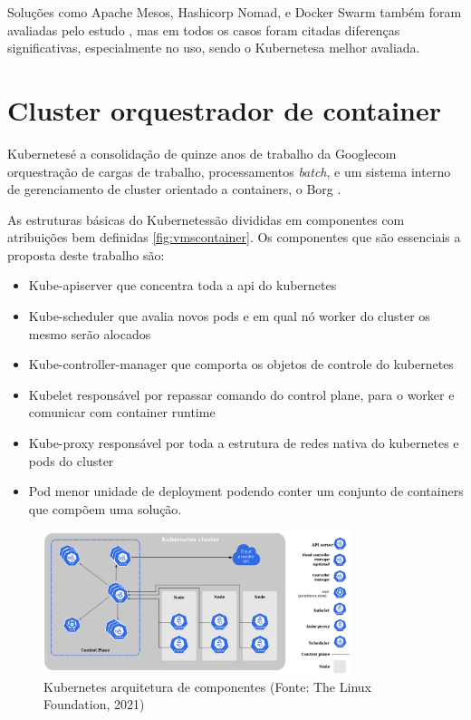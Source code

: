Soluções como Apache Mesos, Hashicorp Nomad, e Docker Swarm também foram avaliadas pelo estudo \cite{truyen_comprehensive_2021}, mas em todos os casos foram citadas diferenças significativas, especialmente no uso, sendo o Kubernetes\textregistered a melhor avaliada. 

\section{Cluster orquestrador de container}

Kubernetes\textregistered é a consolidação de quinze anos de trabalho da Google\textregistered com orquestração de cargas de trabalho, processamentos \emph{batch}, e um sistema interno de gerenciamento de cluster orientado a containers, o Borg \cite{verma_large-scale_2015}. 

As estruturas básicas do Kubernetes\textregistered são divididas em componentes com atribuições bem definidas \ref{fig:vmscontainer}. Os componentes que são essenciais a proposta deste trabalho são:
\begin{itemize}
    \item Kube-apiserver que concentra toda a api do kubernetes
    \item Kube-scheduler que avalia novos pods e em qual nó worker do cluster os mesmo serão alocados
    \item Kube-controller-manager que comporta os objetos de controle do kubernetes
    \item Kubelet responsável por repassar comando do control plane, para o worker e comunicar com container runtime
    \item Kube-proxy responsável por toda a estrutura de redes nativa do kubernetes e pods do cluster
    \item Pod menor unidade de deployment podendo conter um conjunto de containers que compõem uma solução.
\end{itemize}

\begin{figure}[!h]
    \centering
    \includegraphics[width=0.8\textwidth]{04-figuras/kubeadm-node.png}
    \caption{Kubernetes arquitetura de componentes (Fonte: The Linux Foundation\textregistered, 2021)}
    \label{fig:kubenode}
\end{figure}



